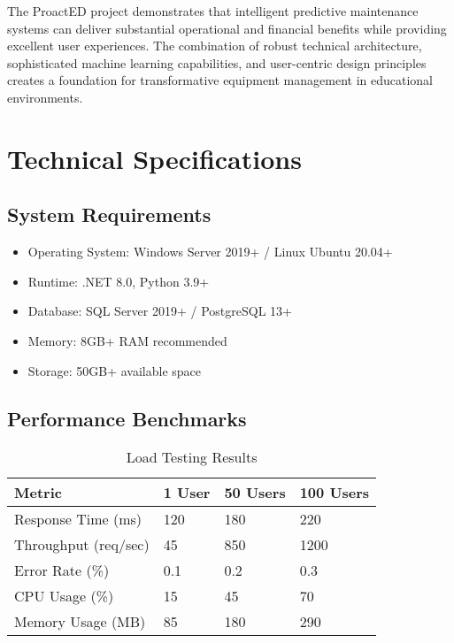 \documentclass[12pt,a4paper]{report}
\begin{document}
The ProactED project demonstrates that intelligent predictive maintenance systems can deliver substantial operational and financial benefits while providing excellent user experiences. The combination of robust technical architecture, sophisticated machine learning capabilities, and user-centric design principles creates a foundation for transformative equipment management in educational environments.




\appendix

\chapter{Technical Specifications}

\section{System Requirements}
\begin{itemize}
    \item Operating System: Windows Server 2019+ / Linux Ubuntu 20.04+
    \item Runtime: .NET 8.0, Python 3.9+
    \item Database: SQL Server 2019+ / PostgreSQL 13+
    \item Memory: 8GB+ RAM recommended
    \item Storage: 50GB+ available space
\end{itemize}

\section{Performance Benchmarks}

\begin{table}[H]
\centering
\caption{Load Testing Results}
\begin{tabular}{|l|l|l|l|}
\hline
\textbf{Metric} & \textbf{1 User} & \textbf{50 Users} & \textbf{100 Users} \\
\hline
Response Time (ms) & 120 & 180 & 220 \\
Throughput (req/sec) & 45 & 850 & 1200 \\
Error Rate (\%) & 0.1 & 0.2 & 0.3 \\
CPU Usage (\%) & 15 & 45 & 70 \\
Memory Usage (MB) & 85 & 180 & 290 \\
\hline
\end{tabular}
\end{table}
\end{document}

